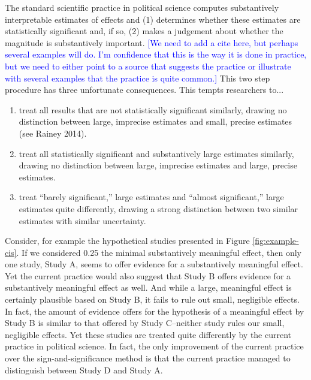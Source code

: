 \documentclass[12pt]{article}
\newcommand{\kelly}[1]{\textcolor{blue}{#1}}
\begin{document}
The standard scientific practice in political science computes substantively interpretable estimates of effects and (1) determines whether these estimates are statistically significant and, if so, (2) makes a judgement about whether the magnitude is substantively important. \kelly{[We need to add a cite here, but perhaps several examples will do. I'm confidence that this is the way it is done in practice, but we need to either point to a source that suggests the practice or illustrate with several examples that the practice is quite common.]} This two step procedure has three unfortunate consequences. This tempts researchers to...
\singlespace
\begin{enumerate}
\item treat all results that are not statistically significant similarly, drawing no distinction between large, imprecise estimates and small, precise estimates (see Rainey 2014).
\item treat all statistically significant and substantively large estimates similarly, drawing no distinction between large, imprecise estimates and large, precise estimates.
\item treat ``barely significant,'' large estimates and ``almost significant,'' large estimates quite differently, drawing a strong distinction between two similar estimates with similar uncertainty.
\end{enumerate}
\doublespace

Consider, for example the hypothetical studies presented in Figure \ref{fig:example-cis}. If we considered 0.25 the minimal substantively meaningful effect, then only one study, Study A, seems to offer evidence for a substantively meaningful effect. Yet the current practice would also suggest that Study B offers evidence for a substantively meaningful effect as well. And while a large, meaningful effect is certainly plausible based on Study B, it fails to rule out small, negligible effects. In fact, the amount of evidence offers for the hypothesis of a meaningful effect by Study B is similar to that offered by Study C--neither study rules our small, negligible effects. Yet these studies are treated quite differently by the current practice in political science. In fact, the only improvement of the current practice over the sign-and-significance method is that the current practice managed to distinguish between Study D and Study A.
\end{document}

